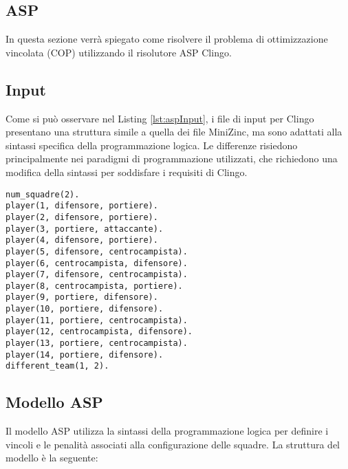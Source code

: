 \documentclass{article}
\begin{document}
\begin{multicols*}{2}
\section{ASP}

In questa sezione verrà spiegato come risolvere il problema di ottimizzazione vincolata (COP) utilizzando il risolutore ASP Clingo.

\subsection{Input}

Come si può osservare nel Listing \ref{lst:aspInput}, i file di input per Clingo presentano una struttura simile a quella dei file MiniZinc, ma sono adattati alla sintassi specifica della programmazione logica. Le differenze risiedono principalmente nei paradigmi di programmazione utilizzati, che richiedono una modifica della sintassi per soddisfare i requisiti di Clingo.

\begin{lstlisting}[style=minizinc, caption={ASP Input}, label={lst:aspInput}]
num_squadre(2).
player(1, difensore, portiere).
player(2, difensore, portiere).
player(3, portiere, attaccante).
player(4, difensore, portiere).
player(5, difensore, centrocampista).
player(6, centrocampista, difensore).
player(7, difensore, centrocampista).
player(8, centrocampista, portiere).
player(9, portiere, difensore).
player(10, portiere, difensore).
player(11, portiere, centrocampista).
player(12, centrocampista, difensore).
player(13, portiere, centrocampista).
player(14, portiere, difensore).
different_team(1, 2).
\end{lstlisting}

\subsection{Modello ASP}

Il modello ASP utilizza la sintassi della programmazione logica per definire i vincoli e le penalità associati alla configurazione delle squadre. La struttura del modello è la seguente:


\end{multicols*}
\end{document}
